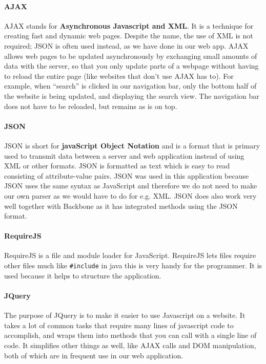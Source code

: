 \paragraph{AJAX}
AJAX\cite{web_3} stands for \textbf{Asynchronous Javascript and XML}. It is a technique for creating fast and dynamic web pages. Despite the name, the use of XML is not required; JSON is often used instead, as we have done in our web app. AJAX allows web pages to be updated asynchronously by exchanging small amounts of data with the server, so that you only update parts of a webpage without having to reload the entire page (like websites that don’t use AJAX has to). For example, when “search” is clicked in our navigation bar, only the bottom half of the website is being updated, and displaying the search view. The navigation bar does not have to be reloaded, but remains as is on top.

\paragraph{JSON}
JSON\cite{web_4} is short for \textbf{javaScript Object Notation} and is a format that is primary used to transmit data between a server and web application instead of using XML or other formats.
JSON is formatted as text which is easy to read consisting of attribute-value pairs.
JSON was used in this application because JSON uses the same syntax as JavaScript and therefore we do not need to make our own parser as we would have to do for e.g. XML. JSON does also work very well together with Backbone as it has integrated methods using the JSON format.

\paragraph{RequireJS}
RequireJS\cite{web_5} is a file and module loader for JavaScript. RequireJS lets files require other files much like \texttt{\#include} in java this is very handy for the programmer. It is used because it helps to structure the application.

\paragraph{JQuery}
The purpose of JQuery\cite{web_6} is to make it easier to use Javascript on a website. It takes a lot of common tasks that require many lines of javascript code to accomplish, and wraps them into methods that you can call with a single line of code. It simplifies other things as well, like AJAX calls and DOM manipulation, both of which are in frequent use in our web application.

